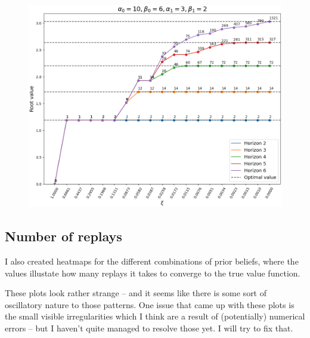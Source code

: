 \documentclass{article}
\begin{document}
\begin{figure}[ht!]
    \centering
    \includegraphics[width=.8\textwidth]{../data/convergence/xi/alpha010_beta06_alpha13_beta12.png}
\end{figure}

\newpage

\subsection*{Number of replays}

I also created heatmaps for the different combinations of prior beliefs, where the values illustate 
how many replays it takes to converge to the true value function.

\bigbreak

These plots look rather strange -- and it seems like there is some sort of oscillatory nature to 
those patterns. One issue that came up with these plots is the small visible irregularities which 
I think are a result of (potentially) numerical errors -- but I haven't quite managed to resolve 
those yet. I will try to fix that.
\end{document}
